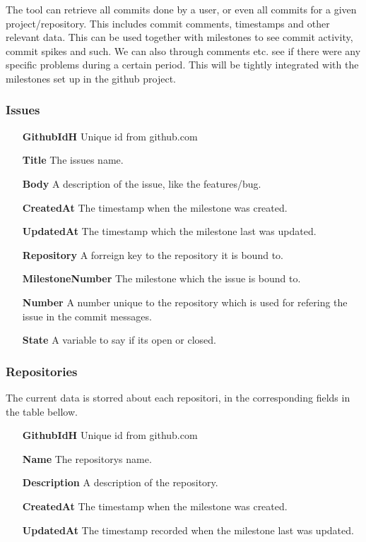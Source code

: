 The tool can retrieve all commits done by a user, or even all commits for a given project/repository. This includes commit comments, timestamps and other relevant data. This can be used together with milestones to see commit activity, commit spikes and such. We can also through comments etc. see if there were any specific problems during a certain period. This will be tightly integrated with the milestones set up in the github project. 

\subsubsection*{Issues}
\vspace{0.5cm}
\begin{itemize}
    \item[\textbf{GithubIdH}]{Unique id from github.com}
    \item[\textbf{Title}]{The issues name.}
    \item[\textbf{Body}]{A description of the issue, like the features/bug.}
    \item[\textbf{CreatedAt}]{The timestamp when the milestone was created.}
    \item[\textbf{UpdatedAt}]{The timestamp which the milestone last was updated.}
    \item[\textbf{Repository}]{A forreign key to the repository it is bound to.}
    \item[\textbf{MilestoneNumber}]{The milestone which the issue is bound to.}
    \item[\textbf{Number}]{A number unique to the repository which is used for refering the issue in the commit messages.}
    \item[\textbf{State}]{A variable to say if its open or closed.}
\end{itemize}
\vspace{0.5cm}

\subsubsection*{Repositories}
The current data is storred about each repositori, in the corresponding fields in the table bellow.
\vspace{0.5cm}
\begin{itemize}
    \item[\textbf{GithubIdH}]{Unique id from github.com}
    \item[\textbf{Name}]{The repositorys name.}
    \item[\textbf{Description}]{A description of the repository.}
    \item[\textbf{CreatedAt}]{The timestamp when the milestone was created.}
    \item[\textbf{UpdatedAt}]{The timestamp recorded when the milestone last was updated.}
\end{itemize}
\vspace{0.5cm}

